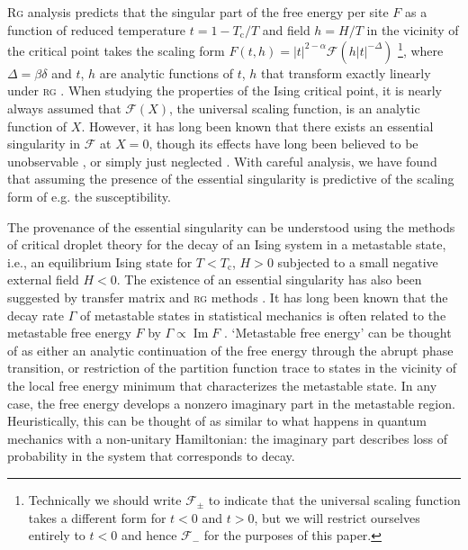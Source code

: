 \documentclass[aps,prl,preprint]{revtex4-1}
\def\im{\mathop{\mathrm{Im}}\nolimits}
\def\c{\mathrm c}
\def\fF{\mathcal F}  %
\begin{document}
\textsc{Rg} analysis predicts that the singular part of the free energy per
site $F$ as a function of reduced temperature $t=1-T_\c/T$ and field $h=H/T$ in
the vicinity of the critical point takes the scaling form
$F(t,h)=|t|^{2-\alpha}\fF(h|t|^{-\Delta})$ \footnote{Technically
we should write $\fF_{\pm}$ to indicate that the universal scaling
function takes a different form for $t<0$ and $t>0$, but we will restrict
ourselves entirely to $t<0$ and hence $\fF_-$ for the purposes of this
paper.}, where $\Delta=\beta\delta$ and $t$, $h$ are analytic functions of
$t$, $h$ that transform exactly linearly under \textsc{rg}
\cite{cardy.1996.scaling,aharony.1983.fields}. When studying the properties of
the Ising critical point, it is nearly always assumed that $\fF(X)$,
the universal scaling function, is an analytic function of $X$. However, it
has long been known that there exists an essential singularity in $\fF$
at $X=0$, though its effects have long been believed to be unobservable
\cite{fisher.1967.condensation}, or simply just neglected
\cite{guida.1997.3dising,schofield.1969.parametric,schofield.1969.correlation,caselle.2001.critical,josephson.1969.equation,fisher.1999.trigonometric}.
With careful analysis, we have found that assuming the presence of the
essential singularity is predictive of the scaling form of e.g. the
susceptibility.

The provenance of the essential singularity can be understood using the
methods of critical droplet theory for the decay of an Ising system in a
metastable state, i.e., an equilibrium Ising state for $T<T_\c$, $H>0$
subjected to a small negative external field $H<0$. The existence of an
essential singularity has also been suggested by transfer matrix
\cite{mccraw.1978.metastability,enting.1980.investigation} and \textsc{rg}
methods \cite{klein.1976.essential}.  It has long been known that the decay
rate $\Gamma$ of metastable states in statistical mechanics is often related
to the metastable free energy $F$ by $\Gamma\propto\im F$
\cite{langer.1969.metastable,penrose.1987.rigorous,gaveau.1989.analytic,privman.1982.analytic}.
`Metastable free energy' can be thought of as either an analytic continuation
of the free energy through the abrupt phase transition, or restriction of the
partition function trace to states in the vicinity of the local free energy
minimum that characterizes the metastable state. In any case, the free energy
develops a nonzero imaginary part in the metastable region. Heuristically,
this can be thought of as similar to what happens in quantum mechanics with a
non-unitary Hamiltonian: the imaginary part describes loss of probability in
the system that corresponds to decay. 
\end{document}
